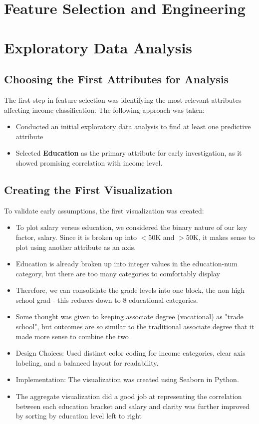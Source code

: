 \documentclass[journal,onecolumn]{IEEEtran}
\begin{document}
\section{Feature Selection and Engineering}

\section{Exploratory Data Analysis}

\subsection{Choosing the First Attributes for Analysis}
The first step in feature selection was identifying the most relevant attributes affecting income classification. The following approach was taken:
\begin{itemize}
    \item Conducted an initial exploratory data analysis to find at least one predictive attribute
    \item Selected \textbf{Education} as the primary attribute for early investigation, as it showed promising correlation with income level.
\end{itemize}

\subsection{Creating the First Visualization}
To validate early assumptions, the first visualization was created:
\begin{itemize}
    \item To plot salary versus education, we considered the binary nature of our key factor, salary. Since it is broken up into $<$50K and $>$50K, it makes sense to plot using another attribute as an axis.
    \item Education is already broken up into integer values in the education-num category, but there are too many categories to comfortably display
    \item Therefore, we can consolidate the grade levels into one block, the non high school grad - this reduces down to 8 educational categories.
    \item Some thought was given to keeping associate degree (vocational) as "trade school", but outcomes are so similar to the traditional associate degree that it made more sense to combine the two
    \item Design Choices: Used distinct color coding for income categories, clear axis labeling, and a balanced layout for readability.
    \item Implementation: The visualization was created using Seaborn in Python.
    \item The aggregate visualization did a good job at representing the correlation between each education bracket and salary and clarity was further improved by sorting by education level left to right
\end{itemize}
\end{document}
